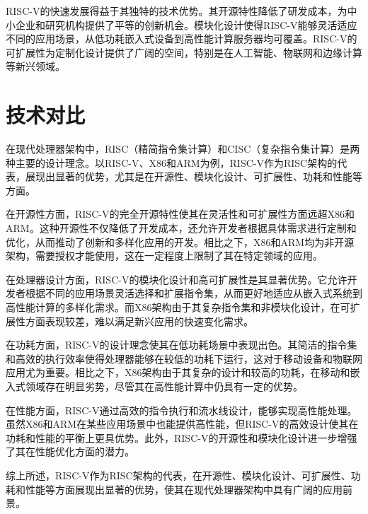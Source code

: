 RISC-V的快速发展得益于其独特的技术优势。其开源特性降低了研发成本，为中小企业和研究机构提供了平等的创新机会。模块化设计使得RISC-V能够灵活适应不同的应用场景，从低功耗嵌入式设备到高性能计算服务器均可覆盖。RISC-V的可扩展性为定制化设计提供了广阔的空间，特别是在人工智能、物联网和边缘计算等新兴领域。

\section{技术对比}
在现代处理器架构中，RISC（精简指令集计算）和CISC（复杂指令集计算）是两种主要的设计理念。以RISC-V、X86和ARM为例，RISC-V作为RISC架构的代表，展现出显著的优势，尤其是在开源性、模块化设计、可扩展性、功耗和性能等方面。

在开源性方面，RISC-V的完全开源特性使其在灵活性和可扩展性方面远超X86和ARM。这种开源性不仅降低了开发成本，还允许开发者根据具体需求进行定制和优化，从而推动了创新和多样化应用的开发。相比之下，X86和ARM均为非开源架构，需要授权才能使用，这在一定程度上限制了其在特定领域的应用。

在处理器设计方面，RISC-V的模块化设计和高可扩展性是其显著优势。它允许开发者根据不同的应用场景灵活选择和扩展指令集，从而更好地适应从嵌入式系统到高性能计算的多样化需求。而X86架构由于其复杂指令集和非模块化设计，在可扩展性方面表现较差，难以满足新兴应用的快速变化需求。

在功耗方面，RISC-V的设计理念使其在低功耗场景中表现出色。其简洁的指令集和高效的执行效率使得处理器能够在较低的功耗下运行，这对于移动设备和物联网应用尤为重要。相比之下，X86架构由于其复杂的设计和较高的功耗，在移动和嵌入式领域存在明显劣势，尽管其在高性能计算中仍具有一定的优势。

在性能方面，RISC-V通过高效的指令执行和流水线设计，能够实现高性能处理。虽然X86和ARM在某些应用场景中也能提供高性能，但RISC-V的高效设计使其在功耗和性能的平衡上更具优势。此外，RISC-V的开源性和模块化设计进一步增强了其在性能优化方面的潜力。

综上所述，RISC-V作为RISC架构的代表，在开源性、模块化设计、可扩展性、功耗和性能等方面展现出显著的优势，使其在现代处理器架构中具有广阔的应用前景。

